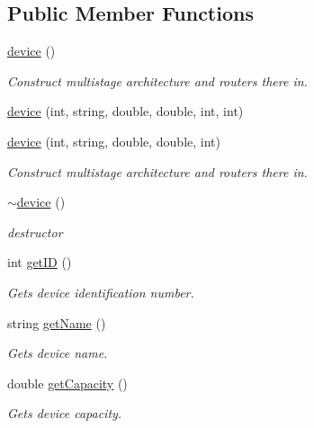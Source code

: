 \subsection*{Public Member Functions}
\begin{DoxyCompactItemize}
\item 
\hyperlink{classdevice_a95ab42e0b2e738637d3414347fa5559c}{device} ()
\begin{DoxyCompactList}\small\item\em Construct multistage architecture and routers there in. \item\end{DoxyCompactList}\item 
\hyperlink{classdevice_a57b9c4ac7a8bd970b81b1154ae79a5de}{device} (int, string, double, double, int, int)
\item 
\hyperlink{classdevice_a3aa4a2a68f49628354dbe33de584f726}{device} (int, string, double, double, int)
\begin{DoxyCompactList}\small\item\em Construct multistage architecture and routers there in. \item\end{DoxyCompactList}\item 
\hyperlink{classdevice_a08545ac77231c68a27c32633a9730a33}{$\sim$device} ()
\begin{DoxyCompactList}\small\item\em destructor \item\end{DoxyCompactList}\item 
int \hyperlink{classdevice_a5b73405bc8184085f92306d4f323b572}{getID} ()
\begin{DoxyCompactList}\small\item\em Gets device identification number. \item\end{DoxyCompactList}\item 
string \hyperlink{classdevice_a9dc7119476febd7ba47060d74ba37e20}{getName} ()
\begin{DoxyCompactList}\small\item\em Gets device name. \item\end{DoxyCompactList}\item 
double \hyperlink{classdevice_ae444f5ce9e539235bc5df36f7b47609c}{getCapacity} ()
\begin{DoxyCompactList}\small\item\em Gets device capacity. \item\end{DoxyCompactList}\item 

\end{DoxyCompactItemize}
